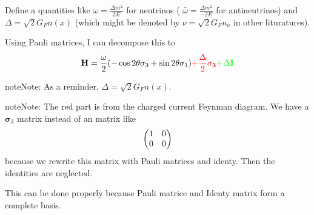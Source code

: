 \documentclass[letterpaper,12pt,english]{sphinxmanual}
\begin{document}
Define a quantities like \(\omega=\frac{ \Delta m^2 }{2E}\) for neutrinos ( \(\bar\omega = \frac{ \Delta m^2 }{-2E}\) for antineutrinos) and \(\Delta = \sqrt{2} G_F n(x)\) (which might be denoted by \(\nu = \sqrt{2}G_F n_\nu\) in other lituratures).

Using Pauli matrices, I can decompose this to
\begin{gather}
\begin{split}\mathbf H = \frac{\omega}{2}( -\cos2\theta \sigma_3 + \sin 2\theta \sigma_1 )   {\color{red} + \frac{\Delta}{2} \mathbf {\sigma_3}}  {\color{green}+ \Delta \mathbf I}\end{split}\notag
\end{gather}
\begin{notice}{note}{Note:}
As a reminder, \(\Delta = \sqrt{2}G_F n(x)\).
\end{notice}

\begin{notice}{note}{Note:}
The red part is from the charged current Feynman diagram. We have a \(\mathbf\sigma_3\) matrix instead of an matrix like
\begin{gather}
\begin{split}\begin{pmatrix}1 & 0 \\ 0 & 0 \end{pmatrix}\end{split}\notag
\end{gather}
because we rewrite this matrix with Pauli matrices and identy. Then the identities are neglected.

This can be done properly because Pauli matrice and Identy matrix form a complete basis.
\end{notice}
\end{document}
